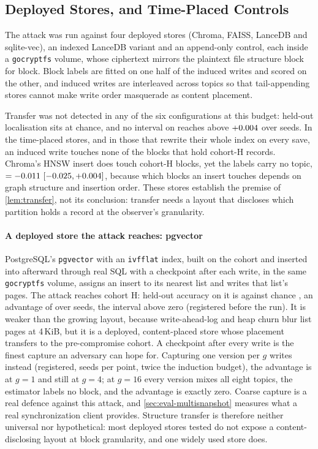 \subsection{Deployed Stores, and Time-Placed Controls}
\label{sec:eval-real}

The attack was run against four deployed stores (Chroma, FAISS, LanceDB and sqlite-vec), an indexed
LanceDB variant and an append-only control, each inside a \texttt{gocryptfs} volume, whose
ciphertext mirrors the plaintext file structure block for block. Block labels are fitted on one
half of the induced writes and scored on the other, and induced writes are interleaved across
topics so that tail-appending stores cannot make write order masquerade as content placement.

Transfer was not detected in any of the six configurations at this budget: held-out localisation
sits at chance, and no interval on \advhist{} reaches above $+0.004$ over \REsixSeeds{}
seeds. In the time-placed stores, and in those that rewrite their whole index on every save, an
induced write touches none of the blocks that hold cohort-H records. Chroma's HNSW insert does touch
cohort-H blocks, yet the labels carry no topic, \advhist{} $= -0.011~[-0.025, +0.004]$, because which blocks an
insert touches depends on graph structure and insertion order. These stores establish the premise of
\cref{lem:transfer}, not its conclusion: transfer needs a layout that discloses which partition
holds a record at the observer's granularity.

\paragraph{A deployed store the attack reaches: pgvector}
PostgreSQL's \texttt{pgvector} with an \texttt{ivfflat} index, built on the cohort and inserted into
afterward through real SQL with a checkpoint after each write, in the same \texttt{gocryptfs}
volume, assigns an insert to its nearest list and writes that list's pages. The attack reaches
cohort H: held-out accuracy on it is \REsixteenPgAcc{} against chance \REsixteenPgChance, an
advantage of \REsixteenPgAdv{} over \REsixteenPgSeeds{} seeds, the interval above zero (registered
before the run). It is weaker than the growing layout, because write-ahead-log and heap churn
blur list pages at 4\,KiB, but it is a deployed, content-placed store whose placement transfers to
the pre-compromise cohort. A checkpoint after every write is the finest capture an adversary can
hope for. Capturing one version per $g$ writes instead (registered, \REthirtytwoSeeds{} seeds per
point, twice the induction budget), the advantage is \REthirtytwoOne{} at $g = 1$ and still
\REthirtytwoFour{} at $g = 4$; at $g = 16$ every version mixes all eight topics, the estimator labels
no block, and the advantage is exactly zero. Coarse capture is a real defence against this attack,
and \cref{sec:eval-multisnapshot} measures what a real synchronization client provides. Structure
transfer is therefore neither universal nor hypothetical: most deployed stores tested do not
expose a content-disclosing layout at block granularity, and one widely used store does.


